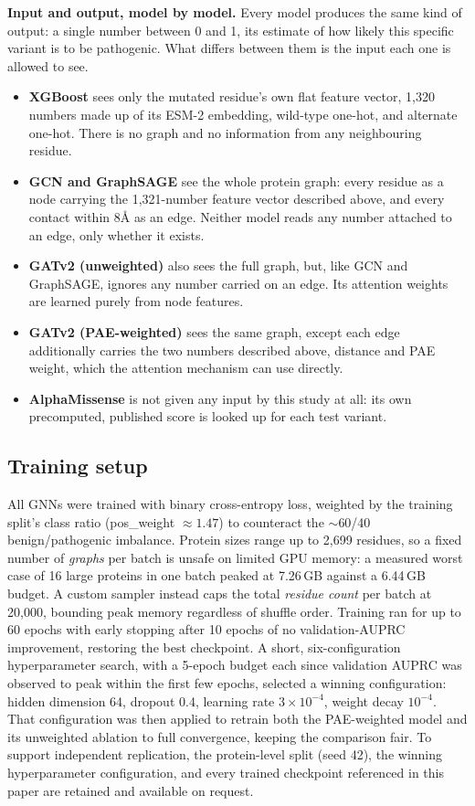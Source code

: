 \documentclass[10pt,conference,a4paper]{IEEEtran}
\begin{document}
\textbf{Input and output, model by model.} Every model produces the same kind of output: a single number between 0 and 1, its estimate of how likely this specific variant is to be pathogenic. What differs between them is the input each one is allowed to see.
\begin{itemize}
\item \textbf{XGBoost} sees only the mutated residue's own flat feature vector, 1{,}320 numbers made up of its ESM-2 embedding, wild-type one-hot, and alternate one-hot. There is no graph and no information from any neighbouring residue.
\item \textbf{GCN and GraphSAGE} see the whole protein graph: every residue as a node carrying the 1{,}321-number feature vector described above, and every contact within 8\r{A} as an edge. Neither model reads any number attached to an edge, only whether it exists.
\item \textbf{GATv2 (unweighted)} also sees the full graph, but, like GCN and GraphSAGE, ignores any number carried on an edge. Its attention weights are learned purely from node features.
\item \textbf{GATv2 (PAE-weighted)} sees the same graph, except each edge additionally carries the two numbers described above, distance and PAE weight, which the attention mechanism can use directly.
\item \textbf{AlphaMissense} is not given any input by this study at all: its own precomputed, published score is looked up for each test variant.
\end{itemize}

\subsection{Training setup}
\label{sec:training}

All GNNs were trained with binary cross-entropy loss, weighted by the training split's class ratio (pos\_weight $\approx 1.47$) to counteract the $\sim$60/40 benign/pathogenic imbalance. Protein sizes range up to 2{,}699 residues, so a fixed number of \textit{graphs} per batch is unsafe on limited GPU memory: a measured worst case of 16 large proteins in one batch peaked at 7.26\,GB against a 6.44\,GB budget. A custom sampler instead caps the total \textit{residue count} per batch at 20{,}000, bounding peak memory regardless of shuffle order. Training ran for up to 60 epochs with early stopping after 10 epochs of no validation-AUPRC improvement, restoring the best checkpoint. A short, six-configuration hyperparameter search, with a 5-epoch budget each since validation AUPRC was observed to peak within the first few epochs, selected a winning configuration: hidden dimension 64, dropout 0.4, learning rate $3\times10^{-4}$, weight decay $10^{-4}$. That configuration was then applied to retrain both the PAE-weighted model and its unweighted ablation to full convergence, keeping the comparison fair. To support independent replication, the protein-level split (seed 42), the winning hyperparameter configuration, and every trained checkpoint referenced in this paper are retained and available on request.
\end{document}
